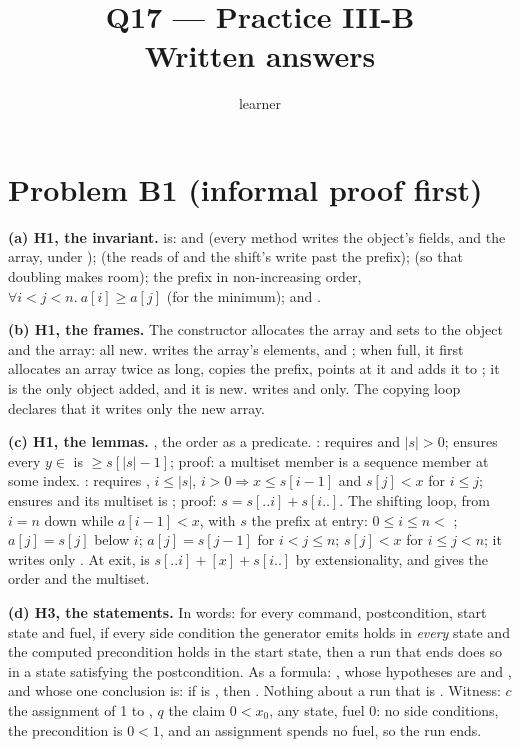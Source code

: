 \documentclass[11pt]{article}
\title{Q17 --- Practice III-B \\ \large Written answers}
\author{learner}
\date{}
\begin{document}
\maketitle
\sloppy

\section*{Problem B1 (informal proof first)}\label{ans:B1}
\begin{answer}
\textbf{(a) H1, the invariant.}  is:  and
 (every method writes the object's fields, and  the
array, under );  (the reads of
 and the shift's write past the prefix);  (so
that doubling makes room); the prefix in non-increasing order,
$\forall i < j < n.\ a[i] \ge a[j]$ (for the minimum); and
.

\textbf{(b) H1, the frames.} The constructor allocates the array and sets
 to the object and the array: all new.  writes the array's
elements,  and ; when full, it first allocates an array twice
as long, copies the prefix, points  at it and adds it to ; it
is the only object added, and it is new.  writes  and
 only. The copying loop declares that it writes only the new array.

\textbf{(c) H1, the lemmas.} , the order as a predicate.
: requires  and $|s| > 0$; ensures every
$y \in$  is $\ge s[|s| - 1]$; proof: a multiset member is a
sequence member at some index. : requires
, $i \le |s|$, $i > 0 \Rightarrow x \le s[i - 1]$ and
$s[j] < x$ for $i \le j$; ensures  and its
multiset is ; proof: $s = s[..i] + s[i..]$.
The shifting loop, from $i = n$ down while $a[i - 1] < x$, with $s$ the prefix
at entry: $0 \le i \le n <$ ; $a[j] = s[j]$ below $i$;
$a[j] = s[j - 1]$ for $i < j \le n$; $s[j] < x$ for $i \le j < n$; it writes
only . At exit,  is $s[..i] + [x] + s[i..]$ by
extensionality, and  gives the order and the multiset.

\textbf{(d) H3, the statements.} In words: for every command, postcondition,
start state and fuel, if every side condition the generator emits holds in
\emph{every} state and the computed precondition holds in the start state, then a
run that ends does so in a state satisfying the postcondition. As a formula:
, whose
hypotheses are 
and , and whose one conclusion is: if
 is , then .
Nothing about a run that is . Witness: $c$ the assignment of 1 to
, $q$ the claim $0 < x_0$, any state, fuel 0: no side conditions, the
precondition is $0 < 1$, and an assignment spends no fuel, so the run ends.


\end{answer}
\end{document}

